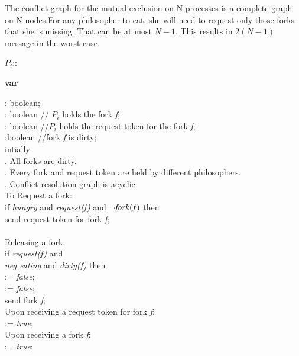 \documentclass[twoside]{article}
\begin{document}
The conflict graph for the mutual exclusion on N processes is a complete graph on N nodes.For
any philosopher to eat, she will need to request only those forks that she is missing. That
can be at most $N - 1$. This results in $2(N - 1)$ message in the worst case.

	
\begin{algorithm}[H]
 $P_i$::
 
\textbf{var}

: boolean;\\
: boolean // $P_i$ holds the fork {\it f};\\
: boolean //$P_i$ holds the request token for the fork {\it f};\\
:boolean //fork {\it f} is dirty;\\

intially\\
. All forks are dirty.\\
. Every fork and request token are held by different philosophers.\\
. Conflict resolution graph is acyclic\\

To Request a fork:\\
\quad if {\it hungry} and {\it request(f)} and $\neg {\it fork(f)}$ then\\
\quad\quad send request token for fork {\it f};\\
\quad{}\\

Releasing a fork:\\
\quad if {\it request(f)} and {\it \\neg eating} and {\it dirty(f)} then\\
\quad{} := {\it false};\\
\quad{} := {\it false};\\
\quad\quad send fork {\it f};\\

Upon receiving a request token for fork {\it f}:\\
:= {\it true};\\

Upon receiving a fork {\it f}:\\
:= {\it true};\\
	
\end{algorithm}
\end{document}
